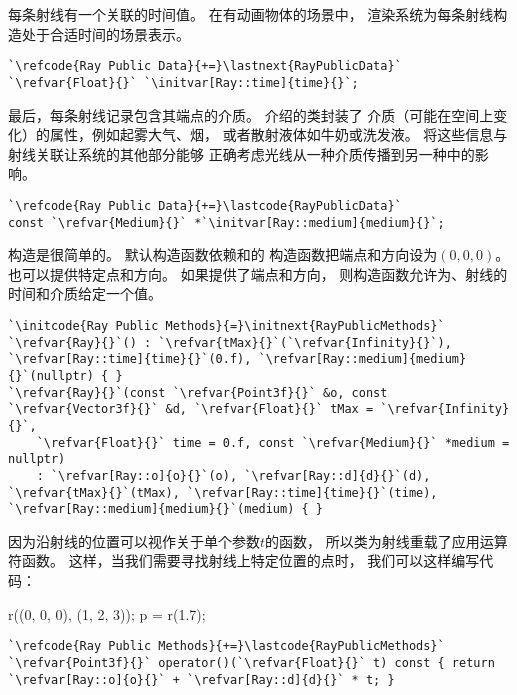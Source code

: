 每条射线有一个关联的时间值。
在有动画物体的场景中，
渲染系统为每条射线构造处于合适时间的场景表示。
\begin{lstlisting}
`\refcode{Ray Public Data}{+=}\lastnext{RayPublicData}`
`\refvar{Float}{}` `\initvar[Ray::time]{time}{}`;
\end{lstlisting}

最后，每条射线记录包含其端点的介质。
介绍的类封装了
介质（可能在空间上变化）的属性，例如起雾大气、烟，
或者散射液体如牛奶或洗发液。
将这些信息与射线关联让系统的其他部分能够
正确考虑光线从一种介质传播到另一种中的影响。
\begin{lstlisting}
`\refcode{Ray Public Data}{+=}\lastcode{RayPublicData}`
const `\refvar{Medium}{}` *`\initvar[Ray::medium]{medium}{}`;
\end{lstlisting}

构造是很简单的。
默认构造函数依赖和的
构造函数把端点和方向设为$(0,0,0)$。
也可以提供特定点和方向。
如果提供了端点和方向，
则构造函数允许为、射线的时间和介质给定一个值。
\begin{lstlisting}
`\initcode{Ray Public Methods}{=}\initnext{RayPublicMethods}`
`\refvar{Ray}{}`() : `\refvar{tMax}{}`(`\refvar{Infinity}{}`), `\refvar[Ray::time]{time}{}`(0.f), `\refvar[Ray::medium]{medium}{}`(nullptr) { }
`\refvar{Ray}{}`(const `\refvar{Point3f}{}` &o, const `\refvar{Vector3f}{}` &d, `\refvar{Float}{}` tMax = `\refvar{Infinity}{}`,
    `\refvar{Float}{}` time = 0.f, const `\refvar{Medium}{}` *medium = nullptr)
    : `\refvar[Ray::o]{o}{}`(o), `\refvar[Ray::d]{d}{}`(d), `\refvar{tMax}{}`(tMax), `\refvar[Ray::time]{time}{}`(time), `\refvar[Ray::medium]{medium}{}`(medium) { }
\end{lstlisting}

因为沿射线的位置可以视作关于单个参数$t$的函数，
所以类为射线重载了应用运算符函数。
这样，当我们需要寻找射线上特定位置的点时，
我们可以这样编写代码：

{\ttfamily\indent\indent{} r((0, 0, 0), (1, 2, 3));}\newline
{\ttfamily\indent\indent{} p = r(1.7);}

\begin{lstlisting}
`\refcode{Ray Public Methods}{+=}\lastcode{RayPublicMethods}`
`\refvar{Point3f}{}` operator()(`\refvar{Float}{}` t) const { return `\refvar[Ray::o]{o}{}` + `\refvar[Ray::d]{d}{}` * t; }
\end{lstlisting}

